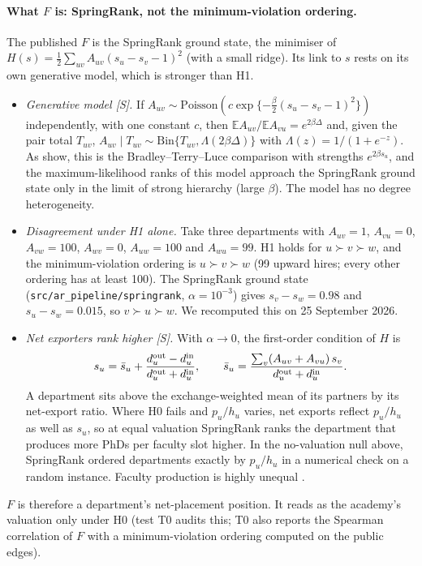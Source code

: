 \paragraph{What $F$ is: SpringRank, not the minimum-violation ordering.} The published $F$ is the SpringRank
ground state, the minimiser of $H(s)=\tfrac12\sum_{uv}A_{uv}(s_u-s_v-1)^2$ (with a small ridge). Its link to $s$
rests on its own generative model, which is stronger than H1.
\begin{itemize}
\item \emph{Generative model [S].} If $A_{uv}\sim\mathrm{Poisson}(c\exp\{-\tfrac{\beta}{2}(s_u-s_v-1)^2\})$
independently, with one constant $c$, then $\mathbb E A_{uv}/\mathbb E A_{vu}=e^{2\beta\Delta}$ and, given the
pair total $T_{uv}$, $A_{uv}\mid T_{uv}\sim\mathrm{Bin}\{T_{uv},\Lambda(2\beta\Delta)\}$ with
$\Lambda(z)=1/(1+e^{-z})$. As \citet{debacco2018physical} show, this is the Bradley--Terry--Luce comparison
\citep{bradley1952rank} with strengths $e^{2\beta s_u}$, and the maximum-likelihood ranks of this model approach
the SpringRank ground state only in the limit of strong hierarchy (large $\beta$). The model has no degree
heterogeneity.
\item \emph{Disagreement under H1 alone.} Take three departments with $A_{uv}=1$, $A_{vu}=0$, $A_{vw}=100$,
$A_{wv}=0$, $A_{uw}=100$ and $A_{wu}=99$. H1 holds for $u\succ v\succ w$, and the minimum-violation ordering is
$u\succ v\succ w$ (99 upward hires; every other ordering has at least 100). The SpringRank ground state
(\texttt{src/ar\_pipeline/springrank}, $\alpha=10^{-3}$) gives $s_v-s_w=0.98$ and $s_u-s_w=0.015$, so $v\succ
u\succ w$. We recomputed this on 25 September 2026.
\item \emph{Net exporters rank higher [S].} With $\alpha\to0$, the first-order condition of $H$ is
\[
s_u=\bar s_u+\frac{d^{\rm out}_u-d^{\rm in}_u}{d^{\rm out}_u+d^{\rm in}_u},\qquad
\bar s_u=\frac{\sum_v(A_{uv}+A_{vu})\,s_v}{d^{\rm out}_u+d^{\rm in}_u}.
\]
A department sits above the exchange-weighted mean of its partners by its net-export ratio. Where H0 fails and
$p_u/h_u$ varies, net exports reflect $p_u/h_u$ as well as $s_u$, so at equal valuation SpringRank ranks the
department that produces more PhDs per faculty slot higher. In the no-valuation null above, SpringRank
ordered departments exactly by $p_u/h_u$ in a numerical check on a random instance. Faculty production is highly
unequal \citep{wapman2022quantifying}.
\end{itemize}
$F$ is therefore a department's net-placement position. It reads as the academy's valuation only under H0 (test
T0 audits this; T0 also reports the Spearman correlation of $F$ with a minimum-violation ordering computed on the
public edges).

